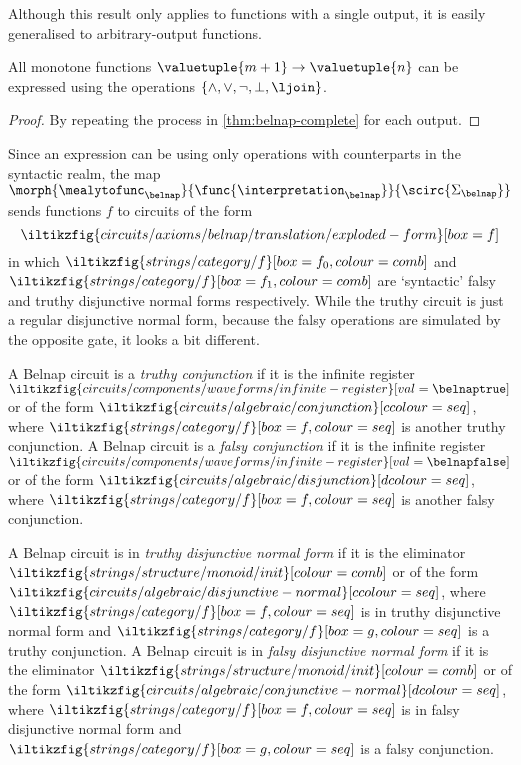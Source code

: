 Although this result only applies to functions with a single output, it is
easily generalised to arbitrary-output functions.

\begin{corollary}
    All monotone functions \(\valuetuple{m+1} \to \valuetuple{n}\) can be
    expressed using the operations \(\{\land,\lor,\neg,\bot,\ljoin\}\).
\end{corollary}
\begin{proof}
    By repeating the process in \cref{thm:belnap-complete} for each output.
\end{proof}

Since an expression can be  using only operations with counterparts in
the syntactic realm, the map \(
\morph{\mealytofunc_\belnap}{\func{\interpretation_\belnap}}{\scirc{\Sigma_\belnap}}
\) sends functions \(f\) to circuits of the form \[
    \iltikzfig{circuits/axioms/belnap/translation/exploded-form}[box=f]
\] in which \(
\iltikzfig{strings/category/f}[box=f_0,colour=comb]
\) and \(
\iltikzfig{strings/category/f}[box=f_1,colour=comb]
\) are `syntactic' falsy and truthy disjunctive normal forms respectively.
While the truthy circuit is just a regular disjunctive normal form, because
the falsy operations are simulated by the opposite gate, it looks a bit
different.

\begin{definition}[Conjunction]
    A Belnap circuit is a \emph{truthy conjunction} if it is the infinite
    register \(
    \iltikzfig{circuits/components/waveforms/infinite-register}[val=\belnaptrue]
    \) or of the form \(
    \iltikzfig{circuits/algebraic/conjunction}[ccolour=seq]
    \), where \(
    \iltikzfig{strings/category/f}[box=f, colour=seq]
    \) is another truthy conjunction.
    A Belnap circuit is a \emph{falsy conjunction} if it is the infinite
    register \(
    \iltikzfig{circuits/components/waveforms/infinite-register}[val=\belnapfalse]
    \) or of the form \(
    \iltikzfig{circuits/algebraic/disjunction}[dcolour=seq]
    \), where \(
    \iltikzfig{strings/category/f}[box=f, colour=seq]
    \) is another falsy conjunction.
\end{definition}

\begin{definition}
    A Belnap circuit is in \emph{truthy disjunctive normal form} if it is the
    eliminator \(
    \iltikzfig{strings/structure/monoid/init}[colour=comb]
    \) or of the form \(
    \iltikzfig{circuits/algebraic/disjunctive-normal}[ccolour=seq]
    \), where \(
    \iltikzfig{strings/category/f}[box=f, colour=seq]
    \) is in truthy disjunctive normal form and \(
    \iltikzfig{strings/category/f}[box=g, colour=seq]
    \) is a truthy conjunction.
    A Belnap circuit is in \emph{falsy disjunctive normal form} if it is the
    eliminator \(
    \iltikzfig{strings/structure/monoid/init}[colour=comb]
    \) or of the form \(
    \iltikzfig{circuits/algebraic/conjunctive-normal}[dcolour=seq]
    \), where \(
    \iltikzfig{strings/category/f}[box=f, colour=seq]
    \) is in falsy disjunctive normal form and \(
    \iltikzfig{strings/category/f}[box=g, colour=seq]
    \) is a falsy conjunction.
\end{definition}

